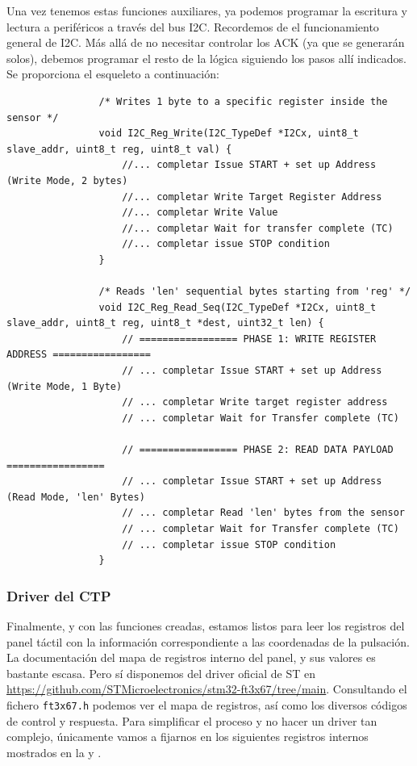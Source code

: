\documentclass[../main.tex]{subfiles}
\begin{document}
            Una vez tenemos estas funciones auxiliares, ya podemos programar la escritura y lectura a periféricos a través del bus I2C. Recordemos de  el funcionamiento general de I2C. Más allá de no necesitar controlar los ACK (ya que se generarán solos), debemos programar el resto de la lógica siguiendo los pasos allí indicados. Se proporciona el esqueleto a continuación:
            
            \begin{lstlisting}
                /* Writes 1 byte to a specific register inside the sensor */
                void I2C_Reg_Write(I2C_TypeDef *I2Cx, uint8_t slave_addr, uint8_t reg, uint8_t val) {
                    //... completar Issue START + set up Address (Write Mode, 2 bytes)
                    //... completar Write Target Register Address
                    //... completar Write Value
                    //... completar Wait for transfer complete (TC)
                    //... completar issue STOP condition
                }

                /* Reads 'len' sequential bytes starting from 'reg' */
                void I2C_Reg_Read_Seq(I2C_TypeDef *I2Cx, uint8_t slave_addr, uint8_t reg, uint8_t *dest, uint32_t len) {
                    // ================= PHASE 1: WRITE REGISTER ADDRESS =================
                    // ... completar Issue START + set up Address (Write Mode, 1 Byte)
                    // ... completar Write target register address
                    // ... completar Wait for Transfer complete (TC)

                    // ================= PHASE 2: READ DATA PAYLOAD =================
                    // ... completar Issue START + set up Address (Read Mode, 'len' Bytes)
                    // ... completar Read 'len' bytes from the sensor
                    // ... completar Wait for Transfer complete (TC)
                    // ... completar issue STOP condition
                }
            \end{lstlisting}

        \subsubsection{Driver del CTP}

            Finalmente, y con las funciones  creadas, estamos listos para leer los registros del panel táctil con la información correspondiente a las coordenadas de la pulsación. La documentación del mapa de registros interno del panel, y sus valores es bastante escasa. Pero sí disponemos del driver oficial de ST en \url{https://github.com/STMicroelectronics/stm32-ft3x67/tree/main}. Consultando el fichero \texttt{ft3x67.h} podemos ver el mapa de registros, así como los diversos códigos de control y respuesta. Para simplificar el proceso y no hacer un driver tan complejo, únicamente vamos a fijarnos en los siguientes registros internos mostrados en la  y .
\end{document}
